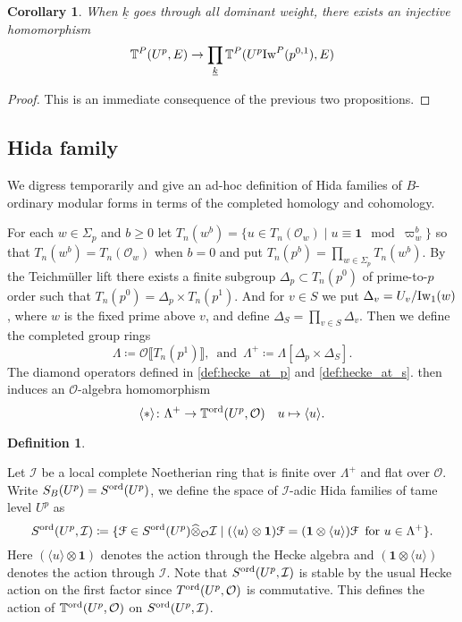 \documentclass[leqno]{amsart}
\newtheorem{cor}[thm]{Corollary}
\theoremstyle{definition}
\newtheorem{defn}[thm]{Definition}
\theoremstyle{remark}
\newcommand{\id}{\mathbf{1}}
\newcommand{\oo}{\mathcal{O}}
\newcommand{\wt}[1]{\underline{ #1 }}
\newcommand{\Iw}{\textnormal{Iw}} %
\newcommand{\TT}{\mathbb{T}} %
\newcommand{\euF}{\EuScript{F}} %
\newcommand{\I}{\mathcal{I}} %
\newcommand{\ord}{\textnormal{ord}} %
\begin{document}
\begin{cor}\label{cor:density}
    When $\wt{k}$ goes through all dominant weight, 
    there exists an injective homomorphism
    \[
        \TT^P(U^p,E)\to \prod_{\wt{k}}\TT^P(U^p\Iw^P(p^{0,1}),E)
    \]
\end{cor}
\begin{proof}
This is an immediate consequence of the previous two propositions.
\end{proof}




\subsection{Hida family}

We digress temporarily 
and give an ad-hoc definition
of Hida families of $B$-ordinary modular forms
in terms of the completed homology and cohomology.

For each $w\in \Sigma_p$ and $b\geq 0$
let $T_n(w^b)=\{u\in T_n(\oo_w)\mid u\equiv \id \mod\varpi_w^b\}$
so that $T_n(w^b)=T_n(\oo_w)$ when $b=0$
and put $T_n(p^b)=\prod_{w\in\Sigma_p}T_n(w^b)$.
By the Teichm\"{u}ller lift
there exists a finite subgroup $\Delta_p\subset T_n(p^0)$
of prime-to-$p$ order such that 
$T_n(p^0)=\Delta_p\times T_n(p^1)$.
And for $v\in S$ 
we put $\Delta_v=U_v/\Iw_1(w)$,
where $w$ is the fixed prime above $v$,
and define $\Delta_S=\prod_{v\in S}\Delta_v$.
Then we define the completed group rings
\begin{equation}\label{def:lambda_rings}
    \Lambda\coloneqq \oo\llbracket T_n(p^1)\rrbracket,\,
    \text{ and }\,
    \Lambda^+\coloneqq \Lambda[\Delta_p\times \Delta_S].
\end{equation}
The diamond operators 
defined in \eqref{def:hecke_at_p} and \eqref{def:hecke_at_s}.
then induces an $\oo$-algebra homomorphism
\begin{equation}\label{eq:Lambda_hecke}
    \langle *\rangle\colon \Lambda^+\to 
    \TT^{\ord}(U^p, \oo)\quad
    u\mapsto \langle u\rangle.
\end{equation}




\begin{defn}\label{def:Hida_family}

Let $\I$ be a local complete Noetherian ring
that is finite over $\Lambda^+$ and flat over $\oo$.
Write $S_B(U^p)=S^{\ord}(U^p)$, we define
the space of $\I$-adic Hida families 
of tame level $U^p$ as 
\begin{equation}\label{eq:Hida_family}
    S^{\ord}(U^p,\I)\coloneqq 
    \{\euF\in S^{\ord}(U^p)\widehat{\otimes}_\oo\I\mid 
    (\langle u\rangle\otimes\id)\euF=
    (\id\otimes\langle u\rangle)\euF\, \text{ for }
    u\in \Lambda^+\}.
\end{equation}
Here $(\langle u\rangle\otimes\id)$ denotes
the action through the Hecke algebra and
$(\id\otimes\langle u\rangle)$ denotes the action
through $\I$.
Note that $S^{\ord}(U^p,\I)$
is stable by the usual Hecke action on 
the first factor since $T^{\ord}(U^p,\oo)$ is commutative.
This defines the action of $\TT^{\ord}(U^p,\oo)$ on $S^{\ord}(U^p,\I)$.
\end{defn}
\end{document}
